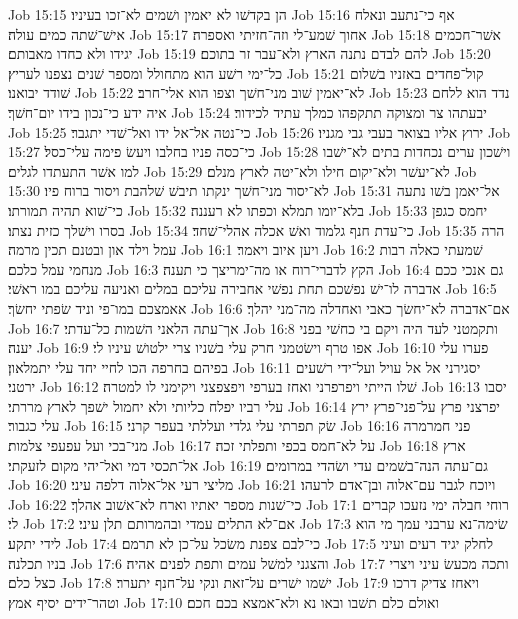 Job 15:15  הן בקדשׁו לא יאמין ושׁמים לא־זכו בעיניו׃
Job 15:16  אף כי־נתעב ונאלח אישׁ־שׁתה כמים עולה׃
Job 15:17  אחוך שׁמע־לי וזה־חזיתי ואספרה׃
Job 15:18  אשׁר־חכמים יגידו ולא כחדו מאבותם׃
Job 15:19  להם לבדם נתנה הארץ ולא־עבר זר בתוכם׃
Job 15:20  כל־ימי רשׁע הוא מתחולל ומספר שׁנים נצפנו לעריץ׃
Job 15:21  קול־פחדים באזניו בשׁלום שׁודד יבואנו׃
Job 15:22  לא־יאמין שׁוב מני־חשׁך וצפו הוא אלי־חרב׃
Job 15:23  נדד הוא ללחם איה ידע כי־נכון בידו יום־חשׁך׃
Job 15:24  יבעתהו צר ומצוקה תתקפהו כמלך עתיד לכידור׃
Job 15:25  כי־נטה אל־אל ידו ואל־שׁדי יתגבר׃
Job 15:26  ירוץ אליו בצואר בעבי גבי מגניו׃
Job 15:27  כי־כסה פניו בחלבו ויעשׂ פימה עלי־כסל׃
Job 15:28  וישׁכון ערים נכחדות בתים לא־ישׁבו למו אשׁר התעתדו לגלים׃
Job 15:29  לא־יעשׁר ולא־יקום חילו ולא־יטה לארץ מנלם׃
Job 15:30  לא־יסור מני־חשׁך ינקתו תיבשׁ שׁלהבת ויסור ברוח פיו׃
Job 15:31  אל־יאמן בשׁו נתעה כי־שׁוא תהיה תמורתו׃
Job 15:32  בלא־יומו תמלא וכפתו לא רעננה׃
Job 15:33  יחמס כגפן בסרו וישׁלך כזית נצתו׃
Job 15:34  כי־עדת חנף גלמוד ואשׁ אכלה אהלי־שׁחד׃
Job 15:35  הרה עמל וילד און ובטנם תכין מרמה׃
Job 16:1  ויען איוב ויאמר׃
Job 16:2  שׁמעתי כאלה רבות מנחמי עמל כלכם׃
Job 16:3  הקץ לדברי־רוח או מה־ימריצך כי תענה׃
Job 16:4  גם אנכי ככם אדברה לו־ישׁ נפשׁכם תחת נפשׁי אחבירה עליכם במלים ואניעה עליכם במו ראשׁי׃
Job 16:5  אאמצכם במו־פי וניד שׂפתי יחשׂך׃
Job 16:6  אם־אדברה לא־יחשׂך כאבי ואחדלה מה־מני יהלך׃
Job 16:7  אך־עתה הלאני השׁמות כל־עדתי׃
Job 16:8  ותקמטני לעד היה ויקם בי כחשׁי בפני יענה׃
Job 16:9  אפו טרף וישׂטמני חרק עלי בשׁניו צרי ילטושׁ עיניו לי׃
Job 16:10  פערו עלי בפיהם בחרפה הכו לחיי יחד עלי יתמלאון׃
Job 16:11  יסגירני אל אל עויל ועל־ידי רשׁעים ירטני׃
Job 16:12  שׁלו הייתי ויפרפרני ואחז בערפי ויפצפצני ויקימני לו למטרה׃
Job 16:13  יסבו עלי רביו יפלח כליותי ולא יחמול ישׁפך לארץ מררתי׃
Job 16:14  יפרצני פרץ על־פני־פרץ ירץ עלי כגבור׃
Job 16:15  שׂק תפרתי עלי גלדי ועללתי בעפר קרני׃
Job 16:16  פני חמרמרה מני־בכי ועל עפעפי צלמות׃
Job 16:17  על לא־חמס בכפי ותפלתי זכה׃
Job 16:18  ארץ אל־תכסי דמי ואל־יהי מקום לזעקתי׃
Job 16:19  גם־עתה הנה־בשׁמים עדי ושׂהדי במרומים׃
Job 16:20  מליצי רעי אל־אלוה דלפה עיני׃
Job 16:21  ויוכח לגבר עם־אלוה ובן־אדם לרעהו׃
Job 16:22  כי־שׁנות מספר יאתיו וארח לא־אשׁוב אהלך׃
Job 17:1  רוחי חבלה ימי נזעכו קברים לי׃
Job 17:2  אם־לא התלים עמדי ובהמרותם תלן עיני׃
Job 17:3  שׂימה־נא ערבני עמך מי הוא לידי יתקע׃
Job 17:4  כי־לבם צפנת משׂכל על־כן לא תרמם׃
Job 17:5  לחלק יגיד רעים ועיני בניו תכלנה׃
Job 17:6  והצגני למשׁל עמים ותפת לפנים אהיה׃
Job 17:7  ותכה מכעשׂ עיני ויצרי כצל כלם׃
Job 17:8  ישׁמו ישׁרים על־זאת ונקי על־חנף יתערר׃
Job 17:9  ויאחז צדיק דרכו וטהר־ידים יסיף אמץ׃
Job 17:10  ואולם כלם תשׁבו ובאו נא ולא־אמצא בכם חכם׃
